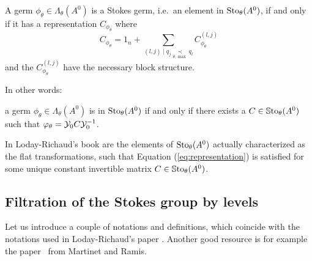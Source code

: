 \begin{cor}
  A germ $\phi_\theta\in\Lambda_\theta(A^0)$ is a Stokes germ, i.e.\ an element
  in $\operatorname{Sto}_\theta(A^0)$, if and only if it has a representation
  $C_{\phi_\theta}$ where
  \[
    C_{\phi_\theta}=1_n +
    \sum_{(l,j)\mid q_j\underset{\theta,\max}{\prec}q_l}
    C_{\phi_\theta}^{(l,j)}
  \]
  and the $C_{\phi_\theta}^{(l,j)}$ have the necessary block structure.

  In other words:
  \begin{einr}
    a germ $\phi_\theta\in\Lambda_\theta(A^0)$ is in $\operatorname{Sto}_\theta(A^0)$ if and
    only if there exists a $C\in\operatorname{\mathbb{S}to}_\theta(A^0)$ such that
    $\varphi_\theta=\mathcal{Y}_{0}C\mathcal{Y}_{0}^{-1}$.
  \end{einr}
  \begin{s-rem}
    In Loday-Richaud's book \cite[78]{Loday2014} are the elements of
    $\operatorname{Sto}_\theta(A^0)$ actually characterized as the flat transformations, such
    that Equation (\ref{eq:representation}) is satisfied for some unique
    constant invertible matrix $C\in\operatorname{\mathbb{S}to}_\theta(A^0)$.
  \end{s-rem}
\end{cor}

\subsection{Filtration of the Stokes group by levels}
Let us introduce a couple of notations and definitions, which coincide with the
notations used in Loday-Richaud's paper \cite{Loday1994}.
Another good resource is for example the paper~\cite[362f]{Martinet1991} from
Martinet and Ramis.

